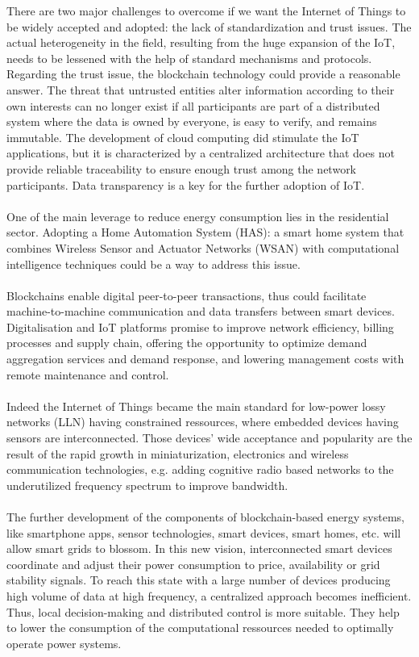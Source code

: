 \documentclass[11pt]{article}
\begin{document}
There are two major challenges to overcome if we want the Internet of Things to be widely accepted and adopted: the lack of standardization and trust issues. The actual heterogeneity in the field, resulting from the huge expansion of the IoT, needs to be lessened with the help of standard mechanisms and protocols. Regarding the trust issue, the blockchain technology could provide a reasonable answer. The threat that untrusted entities alter information according to their own interests can no longer exist if all participants are part of a distributed system where the data is owned by everyone, is easy to verify, and remains immutable. The development of cloud computing did stimulate the IoT applications, but it is characterized by a centralized architecture that does not provide reliable traceability to ensure enough trust among the network participants. Data transparency is a key for the further adoption of IoT.\cite{8}\\\\
One of the main leverage to reduce energy consumption lies in the residential sector. Adopting a Home Automation System (HAS): a smart home system that combines Wireless Sensor and Actuator Networks (WSAN) with computational intelligence techniques could be a way to address this issue.\cite{9}\\\\
Blockchains enable digital peer-to-peer transactions, thus could facilitate machine-to-machine communication and data transfers between smart devices. Digitalisation and IoT platforms promise to improve network efficiency, billing processes and supply chain, offering the opportunity to optimize demand aggregation services and demand response, and lowering management costs with remote maintenance and control.\cite{10}\\\\
Indeed the Internet of Things became the main standard for low-power lossy networks (LLN) having constrained ressources, where embedded devices having sensors are interconnected. Those devices' wide acceptance and popularity are the result of the rapid growth in miniaturization, electronics and wireless communication technologies, e.g. adding cognitive radio based networks to the underutilized frequency spectrum to improve bandwidth.\cite{11}\\\\
The further development of the components of blockchain-based energy systems, like smartphone apps, sensor technologies, smart devices, smart homes, etc. will allow smart grids to blossom. In this new vision, interconnected smart devices coordinate and adjust their power consumption to price, availability or grid stability signals. To reach this state with a large number of devices producing high volume of data at high frequency, a centralized approach becomes inefficient. Thus, local decision-making and distributed control is more suitable. They help to lower the consumption of the computational ressources needed to optimally operate power systems.\cite{10}\\\\
\end{document}
